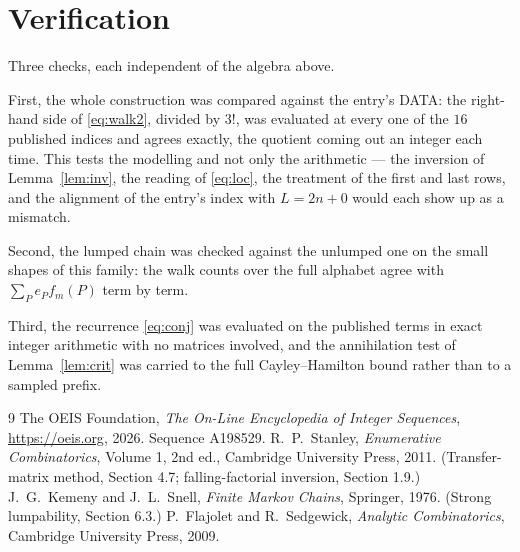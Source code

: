 \documentclass[11pt,a4paper]{article}
\theoremstyle{plain}
\theoremstyle{definition}
\begin{document}
\section{Verification}

Three checks, each independent of the algebra above.

First, the whole construction was compared against the entry's DATA: the right-hand side of
\eqref{eq:walk2}, divided by $3!$, was evaluated at every one of the $16$
published indices and agrees exactly, the quotient coming out an integer each time. This
tests the modelling and not only the arithmetic --- the inversion of Lemma~\ref{lem:inv},
the reading of \eqref{eq:loc}, the treatment of the first and last rows, and the
alignment of the entry's index with $L=2n+0$ would each show up as a mismatch.

Second, the lumped chain was checked against the unlumped one on the small shapes of this
family: the walk counts over the full alphabet agree with $\sum_P e_Pf_m(P)$ term by term.

Third, the recurrence \eqref{eq:conj} was evaluated on the published terms in exact integer
arithmetic with no matrices involved, and the annihilation test of Lemma~\ref{lem:crit} was
carried to the full Cayley--Hamilton bound rather than to a sampled prefix.

\begin{thebibliography}{9}
 The OEIS Foundation, \emph{The On-Line Encyclopedia of Integer
Sequences}, \url{https://oeis.org}, 2026. Sequence A198529.
 R.~P.~Stanley, \emph{Enumerative Combinatorics}, Volume 1, 2nd ed.,
Cambridge University Press, 2011. (Transfer-matrix method, Section 4.7; falling-factorial
inversion, Section 1.9.)
 J.~G.~Kemeny and J.~L.~Snell, \emph{Finite Markov Chains}, Springer,
1976. (Strong lumpability, Section 6.3.)
 P.~Flajolet and R.~Sedgewick, \emph{Analytic Combinatorics}, Cambridge
University Press, 2009.
\end{thebibliography}
\end{document}
